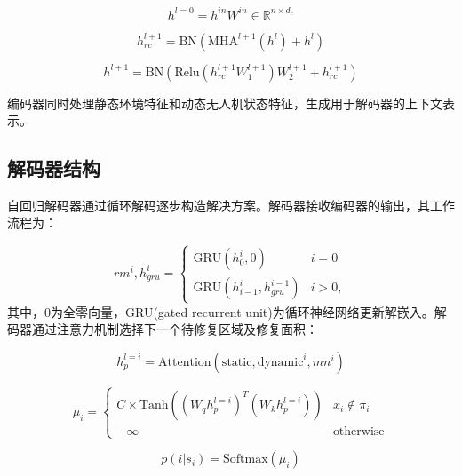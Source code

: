 \documentclass[AutoFakeBold]{LZUThesis}
\begin{document}
\begin{equation}
	h^{l=0} = h^{in} W^{in} \in \mathbb{R}^{n \times d_e}
	\label{eq:13a}
\end{equation}

\begin{equation}
	h_{rc}^{l+1} = \text{BN}\left(\text{MHA}^{l+1}(h^l) + h^l\right)
	\label{eq:13b}
\end{equation}

\begin{equation}
	h^{l+1} = \text{BN}\left(\text{Relu}\left(h_{rc}^{l+1} W_1^{l+1}\right) W_2^{l+1} + h_{rc}^{l+1}\right)
	\label{eq:13c}
\end{equation}

编码器同时处理静态环境特征和动态无人机状态特征，生成用于解码器的上下文表示。

\subsection{解码器结构}

自回归解码器通过循环解码逐步构造解决方案。解码器接收编码器的输出，其工作流程为：

\begin{equation}
	rm^{i}, h_{gru}^{i} =
	\left\{
	\begin{array}{ll}
		\text{GRU}(h_{0}^{i}, 0)               & i = 0 \\
		\text{GRU}(h_{i-1}^{i}, h_{gru}^{i-1}) & i > 0,
	\end{array}
	\right.
	\label{eq:14}
\end{equation}
其中，$0$为全零向量，GRU(gated recurrent unit)为循环神经网络更新解嵌入。解码器通过注意力机制选择下一个待修复区域及修复面积：

\begin{equation}
	h_{p}^{l=i} = \text{Attention}(\text{static}, \text{dynamic}^{i}, mn^{i})
	\label{eq:15a}
\end{equation}

\begin{equation}
	\mu_{i} =
	\begin{cases}
		C \times \text{Tanh}\left((W_{q}h_{p}^{l=i})^{T}(W_{k}h_{p}^{l=i})\right) & x_{i} \notin \pi_{i} \\
		-\infty                                                                   & \text{otherwise}
	\end{cases}
	\label{eq:15b}
\end{equation}

\begin{equation}
	p(i|s_{i}) = \text{Softmax}(\mu_{i})
	\label{eq:15c}
\end{equation}
\end{document}
